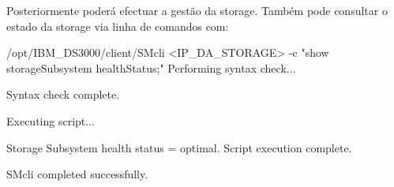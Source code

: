 Posteriormente poderá efectuar a gestão da storage. Também pode consultar o estado da storage via linha de comandos com:

\begin{Output}[commandchars=\\\{\}]
/opt/IBM\_DS3000/client/SMcli <IP\_DA\_STORAGE>  -c "show storageSubsystem healthStatus;"
Performing syntax check...

Syntax check complete.

Executing script...

Storage Subsystem health status = optimal.
Script execution complete.

SMcli completed successfully.
\end{Output}
